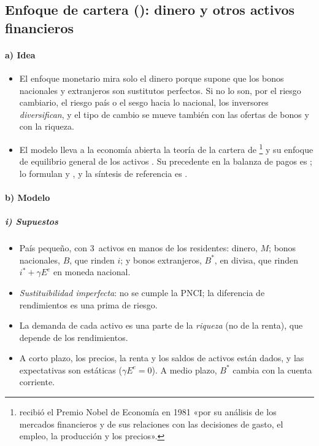 \documentclass[11pt]{article}
\begin{document}
\subsection{Enfoque de cartera ():\cortetitulo{} dinero y otros activos financieros}\label{sec:cartera}

\paragraph{a) Idea}
\begin{itemize}
\item El enfoque monetario mira solo el dinero porque supone que los bonos nacionales y extranjeros son sustitutos perfectos. Si no lo son, por el riesgo cambiario, el riesgo país o el sesgo hacia lo nacional, los inversores \emph{diversifican}, y el tipo de cambio se mueve también con las ofertas de bonos y con la riqueza.
\item El modelo lleva a la economía abierta la teoría de la cartera de \textcite{Tobin1958Liquidity}\footnote{ recibió el Premio Nobel de Economía en 1981 «por su análisis de los mercados financieros y de sus relaciones con las decisiones de gasto, el empleo, la producción y los precios»\nocite{Nobel1981Tobin}.} y su enfoque de equilibrio general de los activos\nocite{Tobin1969General} . Su precedente en la balanza de pagos es \textcite{McKinnonOates1966Implications}; lo formulan \textcite{Branson1977Asset} y \textcite{BransonHalttunenMasson1977}, y la síntesis de referencia es \textcite{BransonHenderson1985}.
\end{itemize}

\paragraph{b) Modelo}
\subparagraph{i) Supuestos}
\begin{itemize}
\item País pequeño, con 3~activos en manos de los residentes: dinero, $M$; bonos nacionales, $B$, que rinden $i$; y bonos extranjeros, $B^*$, en divisa, que rinden $i^*+\gamma E^e$ en moneda nacional.
\item \emph{Sustituibilidad imperfecta}: no se cumple la PNCI; la diferencia de rendimientos es una prima de riesgo.
\item La demanda de cada activo es una parte de la \emph{riqueza} (no de la renta), que depende de los rendimientos.
\item A corto plazo, los precios, la renta y los saldos de activos están dados, y las expectativas son estáticas ($\gamma E^e=0$). A medio plazo, $B^*$ cambia con la cuenta corriente.
\end{itemize}
\end{document}
